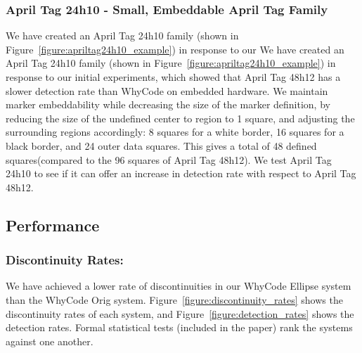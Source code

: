 \subsubsection{April Tag 24h10 - Small, Embeddable April Tag Family}
We have created an April Tag 24h10 family (shown in Figure~\ref{figure:apriltag24h10_example}) in response to our
We have created an April Tag 24h10 family (shown in Figure~\ref{figure:apriltag24h10_example}) in response to our
initial experiments, which showed that April Tag 48h12 has a slower detection rate than WhyCode on embedded hardware.
We maintain marker embeddability while decreasing the size of the marker definition,
by reducing the size of the undefined center to region to 1 square, and adjusting the surrounding regions accordingly:
8 squares for a white border, 16 squares for a black border, and 24 outer data squares.
This gives a total of 48 defined squares(compared to the 96 squares of April Tag 48h12).
We test April Tag 24h10 to see if it can offer an increase in detection rate with respect to April Tag 48h12.

\subsection{Performance}

\subsubsection{Discontinuity Rates:}
We have achieved a lower rate of discontinuities in our WhyCode Ellipse system than the WhyCode Orig system.
Figure~\ref{figure:discontinuity_rates} shows the discontinuity rates of each system,
and Figure~\ref{figure:detection_rates} shows the detection rates.
Formal statistical tests (included in the paper) rank the systems against one another.

